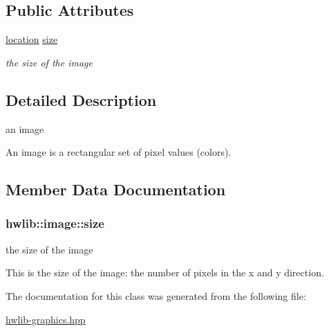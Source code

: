 \subsection*{Public Attributes}
\begin{DoxyCompactItemize}
\item 
\hyperlink{classhwlib_1_1location}{location} \hyperlink{classhwlib_1_1image_ab675f56d00632a4099ed9ec1d4539165}{size}
\begin{DoxyCompactList}\small\item\em the size of the image \end{DoxyCompactList}\end{DoxyCompactItemize}


\subsection{Detailed Description}
an image 

An image is a rectangular set of pixel values (colors). 

\subsection{Member Data Documentation}
\subsubsection[{\texorpdfstring{size}{size}}]{ hwlib\+::image\+::size}\hypertarget{classhwlib_1_1image_ab675f56d00632a4099ed9ec1d4539165}{}\label{classhwlib_1_1image_ab675f56d00632a4099ed9ec1d4539165}


the size of the image 

This is the size of the image\+: the number of pixels in the x and y direction. 

The documentation for this class was generated from the following file\+:\begin{DoxyCompactItemize}
\item 
\hyperlink{hwlib-graphics_8hpp}{hwlib-\/graphics.\+hpp}\end{DoxyCompactItemize}
